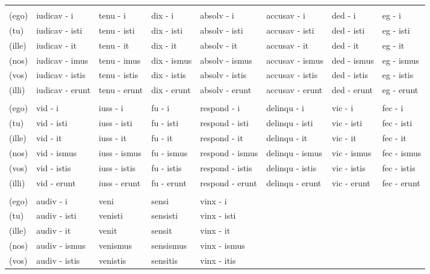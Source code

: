 \documentclass[a4paper, landscape]{article}
\begin{document}
\begin{landscape}
\begin{table}[]
\begin{tabular}{llllllll}
	& & & &  &  &  & \\
	(ego)	& iudicav - i		& tenu - i		& dix - i		& absolv - i	 & accusav - i		& ded -  i		& eg - i \\ 
	(tu)	& iudicav - isti	& tenu - isti	& dix - isti 	& absolv - isti  & accusav - isti	& ded - isti 	& eg - isti \\
	(ille)	& iudicav - it		& tenu - it 	& dix - it		& absolv - it	 & accusav - it		& ded - it		& eg - it  \\
	(nos)	& iudicav - imus	& tenu - imus	& dix - ismus	& absolv - ismus & accusav - ismus	& ded - ismus 	& eg - ismus \\
	(vos)	& iudicav - istis	& tenu - istis	& dix - istis	& absolv - istis & accusav - istis	& ded - istis	& eg - istis \\
	(illi)	& iudicav - erunt	& tenu - erunt	& dix - erunt	& absolv - erunt & accusav - erunt	& ded - erunt	& eg - erunt \\
	& & & &  &  &  & \\
	(ego)	& vid - i	  & iuss - i	 & fu - i		& respond - i		& delinqu - i		& vic - i		& fec - i \\
	(tu)	& vid - isti  & iuss - isti  & fu - isti 	& respond - isti	& delinqu - isti	& vic - isti	& fec - isti \\
	(ille)	& vid - it	  & iuss - it	 & fu - it		& respond - it		& delinqu - it		& vic - it		& fec - it \\
	(nos)	& vid - ismus & iuss - ismus & fu - ismus	& respond - ismus	& delinqu - ismus	& vic - ismus	& fec - ismus \\
	(vos)	& vid - istis & iuss - istis & fu - istis	& respond - istis	& delinqu - istis	& vic - istis	& fec - istis \\
	(illi)	& vid - erunt & iuss - erunt & fu - erunt 	& respond - erunt	& delinqu - erunt	& vic - erunt	& fec - erunt  \\
	& & & & &  &  & \\
	(ego)	& audiv - i		& veni		& sensi		& vinx - i		&  &  & \\
	(tu)	& audiv - isti	& venisti	& sensisti  & vinx - isti	&  &  & \\
	(ille)	& audiv - it	& venit		& sensit	& vinx - it		&  &  & \\
	(nos)	& audiv - ismus & venismus	& sensismus & vinx - ismus  &  &  & \\
	(vos)	& audiv - istis & venistis	& sensitis	& vinx - itis	&  &  & \\

\end{tabular}
\end{table}
\end{landscape}
\end{document}
